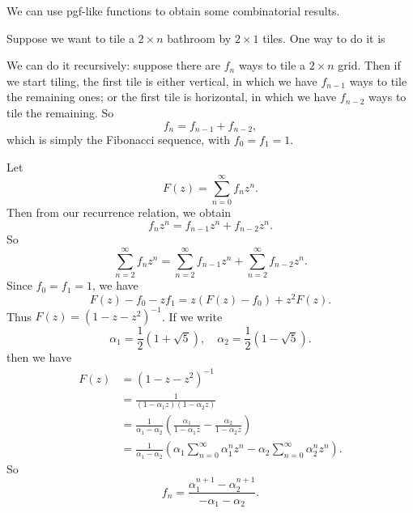 \documentclass[a4paper]{article}
\begin{document}
We can use pgf-like functions to obtain some combinatorial results.
\begin{eg}
  Suppose we want to tile a $2\times n$ bathroom by $2\times 1$ tiles. One way to do it is
  \begin{center}
  \end{center}
  We can do it recursively: suppose there are $f_n$ ways to tile a $2\times n$ grid. Then if we start tiling, the first tile is either vertical, in which we have $f_{n - 1}$ ways to tile the remaining ones; or the first tile is horizontal, in which we have $f_{n - 2}$ ways to tile the remaining. So
  \[
    f_n = f_{n - 1} + f_{n - 2},
  \]
  which is simply the Fibonacci sequence, with $f_0 = f_1 = 1$.

  Let
  \[
    F(z) = \sum_{n = 0}^\infty f_nz^n.
  \]
  Then from our recurrence relation, we obtain
  \[
    f_nz^n = f_{n - 1}z^n + f_{n - 2}z^n.
  \]
  So
  \[
    \sum_{n = 2}^\infty f_n z^n = \sum_{n = 2}^{\infty} f_{n - 1}z^n + \sum_{n = 2}^\infty f_{n - 2}z^n.
  \]
  Since $f_0 = f_1 = 1$, we have
  \[
    F(z) - f_0 - zf_1 = z(F(z) - f_0) + z^2F(z).
  \]
  Thus $F(z) = (1 - z - z^2)^{-1}$. If we write
  \[
    \alpha_1 = \frac{1}{2}(1 + \sqrt{5}),\quad \alpha_2 = \frac{1}{2}(1 - \sqrt{5}).
  \]
  then we have
  \begin{align*}
    F(z) &= (1 - z - z^2)^{-1}\\
    &= \frac{1}{(1 - \alpha_1 z)(1 - \alpha_2 z)}\\
    &= \frac{1}{\alpha_1 - \alpha_2}\left(\frac{\alpha_1}{1 - \alpha_1 z} - \frac{\alpha_2}{1 - \alpha_2 z}\right)\\
    &= \frac{1}{\alpha_1 - \alpha_2}\left(\alpha_1 \sum_{n = 0}^\infty \alpha_1^nz^n - \alpha_2\sum_{n = 0}^\infty \alpha_2^n z^n\right).
  \end{align*}
  So
  \[
    f_n = \frac{\alpha_1^{n + 1} - \alpha_2^{n + 1}}{ - \alpha_1 - \alpha_2}.
  \]
\end{eg}
\end{document}
